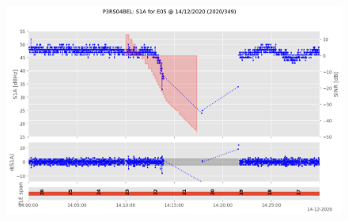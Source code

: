 \begin{enumerate}
\begin{figure}[H]%
\centering%
\includegraphics[width=0.95\linewidth]{png/P3RS04BEL_R_20203490000_01D_00U_MO_E-S1A-E05.png}%
\end{figure}


\end{enumerate}
